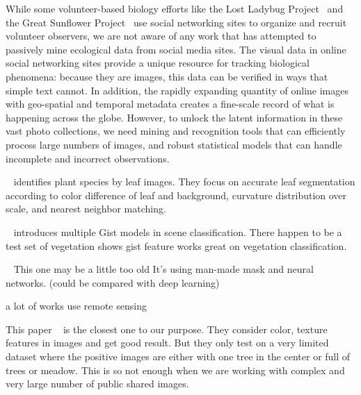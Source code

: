 \documentclass[10pt,journal,compsoc]{IEEEtran}
\begin{document}
While some volunteer-based biology efforts like the Lost Ladybug
Project~\cite{lostladybug} and the Great Sunflower
Project~\cite{greatsunflower} use social networking sites to
organize and recruit volunteer observers, we are not aware of any
work that has attempted to passively mine ecological data from social media
sites. The visual data in online social networking sites provide a
unique resource for tracking biological phenomena:  because they are
images, this data can be verified in ways that simple text 
cannot.  In addition, the rapidly expanding quantity
of online images with geo-spatial and temporal metadata creates a
fine-scale record of what is happening across the globe.  However, to
unlock the latent information in these vast photo collections, we need
 mining and recognition tools that can efficiently
process large numbers of images, and robust statistical models that
can handle incomplete and incorrect observations.








~\cite{Leafsnap: A Computer Vision System for
Automatic Plant Species Identification} identifies plant species by leaf images. They focus on accurate leaf segmentation according to color difference of leaf and background, curvature distribution over scale, and nearest neighbor matching.

~\cite{Comparisons of Gist Models in Rapid Scene categorization tasks}
introduces multiple Gist models in scene classification. There happen to be a test set of vegetation shows gist feature works great on vegetation classification.

~\cite{Detecting subpixel woody vegetation in digital imagery using two artificial intelligence approaches}
This one may be a little too old
It's using man-made mask and neural networks.
(could be compared with deep learning)

a lot of works use remote sensing 

This paper ~\cite{greenery and non-greenery image classification using adaptive neuro-guzzy inference system}
is the closest one to our purpose.
They consider
color, texture features in images and get good result. But they only test on a very limited dataset where the positive images are either with one tree in the center or full of trees or meadow. This is so not enough when we are working with  complex and very large number of public shared images.
\end{document}
